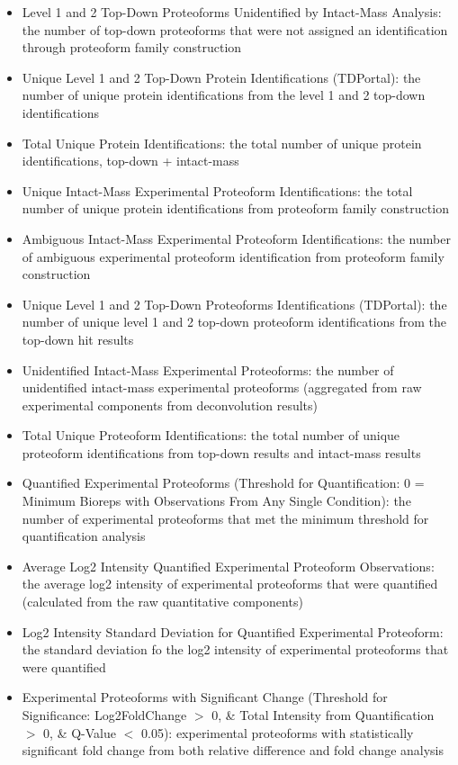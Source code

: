 \begin{itemize}
\begin{itemize}
\item Level 1 and 2  Top-Down Proteoforms Unidentified by Intact-Mass Analysis: the number of top-down proteoforms that were not assigned an identification through proteoform family construction
\item Unique Level 1 and 2 Top-Down Protein Identifications (TDPortal): the number of unique protein identifications from the level 1 and 2 top-down identifications 
\item Total Unique Protein Identifications: the total number of unique protein identifications, top-down + intact-mass
\item Unique Intact-Mass Experimental Proteoform Identifications: the total number of unique protein identifications from proteoform family construction
\item Ambiguous Intact-Mass Experimental Proteoform Identifications: the number of ambiguous experimental proteoform identification from proteoform family construction
\item Unique Level 1 and 2 Top-Down Proteoforms Identifications (TDPortal): the number of unique level 1 and 2 top-down proteoform identifications from the top-down hit results
\item Unidentified Intact-Mass Experimental Proteoforms: the number of unidentified intact-mass experimental proteoforms (aggregated from raw experimental components from deconvolution results)
\item Total Unique Proteoform Identifications: the total number of unique proteoform identifications from top-down results and intact-mass results
\item Quantified Experimental Proteoforms (Threshold for Quantification: 0 = Minimum Bioreps with Observations From Any Single Condition): the number of experimental proteoforms that met the minimum threshold for quantification analysis
\item Average Log2 Intensity Quantified Experimental Proteoform Observations: the average log2 intensity of experimental proteoforms that were quantified (calculated from the raw quantitative components)
\item Log2 Intensity Standard Deviation for Quantified Experimental Proteoform: the standard deviation fo the log2 intensity of experimental proteoforms that were quantified
\item Experimental Proteoforms with Significant Change (Threshold for Significance: Log2FoldChange $>$ 0, \& Total Intensity from Quantification $>$ 0, \& Q-Value $<$ 0.05): experimental proteoforms with statistically significant fold change from both relative difference and fold change analysis

\end{itemize}
\end{itemize}
